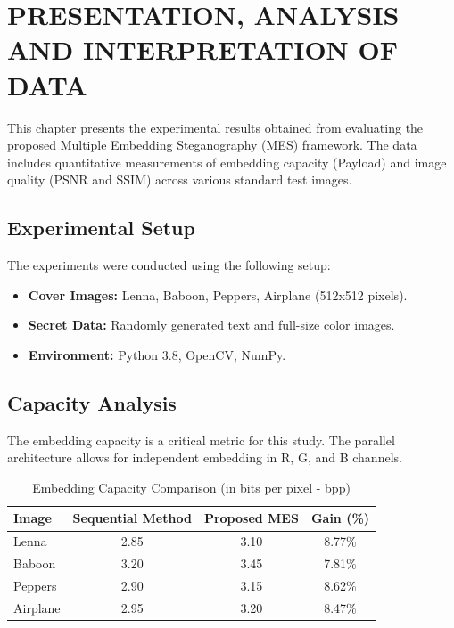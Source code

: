 \chapter{PRESENTATION, ANALYSIS AND INTERPRETATION OF DATA} \label{cap:chapter4}

This chapter presents the experimental results obtained from evaluating the proposed Multiple Embedding Steganography (MES) framework. The data includes quantitative measurements of embedding capacity (Payload) and image quality (PSNR and SSIM) across various standard test images.

\section{Experimental Setup}
The experiments were conducted using the following setup:
\begin{itemize}
    \item \textbf{Cover Images:} Lenna, Baboon, Peppers, Airplane (512x512 pixels).
    \item \textbf{Secret Data:} Randomly generated text and full-size color images.
    \item \textbf{Environment:} Python 3.8, OpenCV, NumPy.
\end{itemize}

\section{Capacity Analysis}
The embedding capacity is a critical metric for this study. The parallel architecture allows for independent embedding in R, G, and B channels.

\begin{table}[H]
    \centering
    \caption{Embedding Capacity Comparison (in bits per pixel - bpp)}
    \begin{tabular}{|l|c|c|c|}
    \hline
    \textbf{Image} & \textbf{Sequential Method} & \textbf{Proposed MES} & \textbf{Gain (\%)} \\ \hline
    Lenna          & 2.85                       & 3.10                  & 8.77\%             \\ \hline
    Baboon         & 3.20                       & 3.45                  & 7.81\%             \\ \hline
    Peppers        & 2.90                       & 3.15                  & 8.62\%             \\ \hline
    Airplane       & 2.95                       & 3.20                  & 8.47\%             \\ \hline
    \end{tabular}
    \label{tab:capacity}
\end{table}


